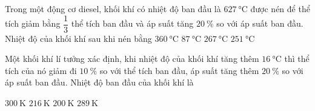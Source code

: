 \begin{ex}
	Trong một động cơ diesel, khối khí có nhiệt độ ban đầu là $\SI{627}{\celsius}$ được nén để thể tích giảm bằng $\dfrac{1}{3}$ thể tích ban đầu và áp suất tăng $\SI{20}{\percent}$ so với áp suất ban đầu. Nhiệt độ của khối khí sau khi nén bằng
	\choice
	{$\SI{360}{\celsius}$}
	{\True $\SI{87}{\celsius}$}
	{$\SI{267}{\celsius}$}
	{$\SI{251}{\celsius}$}
\end{ex}
\begin{ex}
	Một khối khí lí tưởng xác định, khi nhiệt độ của khối khí tăng thêm $\SI{16}{\celsius}$ thì thể tích của nó giảm đi $\SI{10}{\percent}$ so với thể tích ban đầu, áp suất tăng thêm $\SI{20}{\percent}$ so với áp suất ban đầu. Nhiệt độ ban đầu của khối khí là
	
	\choice
	{$\SI{300}{\kelvin}$}
	{$\SI{216}{\kelvin}$}
	{\True $\SI{200}{\kelvin}$}
	{$\SI{289}{\kelvin}$}
\end{ex}
